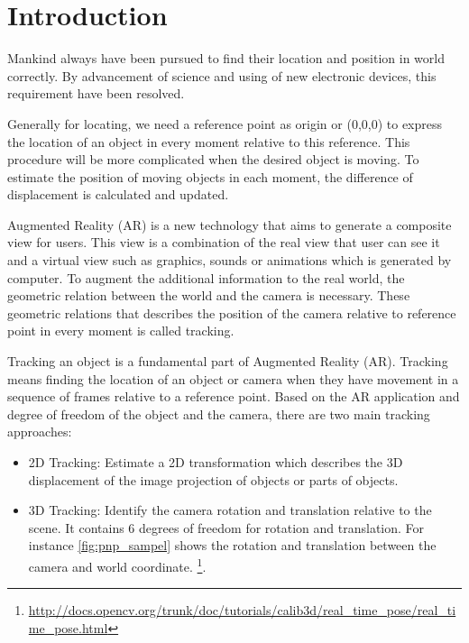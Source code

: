\chapter{Introduction}\label{chapter:introduction}
Mankind always have been pursued to find their location and position in world correctly. By advancement of science and using of new electronic devices, this requirement have been resolved. 

Generally for locating, we need a reference point as origin or (0,0,0) to express the location of an object in every moment relative to this reference. This procedure will be more complicated when the desired object is moving. To estimate the position of moving objects in each moment, the difference of displacement is calculated and updated.

Augmented Reality (AR) is a new technology that aims to generate a composite view for users. This view is a combination of the real view that user can see it and a virtual view such as graphics, sounds or animations which is generated by computer. To augment the additional information to the real world, the geometric relation between the world and the camera is necessary. These geometric relations that describes the position of the camera relative to reference point in every moment is called tracking.

Tracking an object is a fundamental part of Augmented Reality (AR). Tracking means finding the location of an object or camera when they have movement in a sequence of frames relative to a reference point. Based on the AR application and degree of freedom of the object and the camera, there are two main tracking approaches:

\begin{itemize}
\item 2D Tracking: Estimate a 2D transformation which describes the 3D displacement of the image projection of objects or parts of objects.
\item 3D Tracking: Identify the camera rotation and translation relative to the scene. It contains 6 degrees of freedom for rotation and translation. For instance \autoref{fig:pnp_sampel} shows the rotation and translation between the camera and world coordinate. \footnote{\url{http://docs.opencv.org/trunk/doc/tutorials/calib3d/real_time_pose/real_time_pose.html}}.
\end{itemize}

